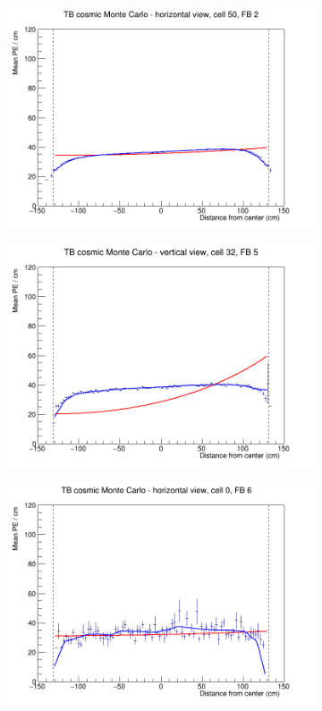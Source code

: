 \documentclass[12pt,a4paper]{article}
\begin{document}
\begin{figure}[h]
  \begin{subfigure}{0.5\textwidth}
    \includegraphics[width=\linewidth]{RelativeCalibrationResults/sim_fb2_001_050.png}
  \end{subfigure}
  \begin{subfigure}{0.5\textwidth}
    \includegraphics[width=\linewidth]{RelativeCalibrationResults/sim_fb5_000_032.png}
  \end{subfigure}
  \begin{subfigure}{0.5\textwidth}
    \includegraphics[width=\linewidth]{RelativeCalibrationResults/sim_fb6_001_000.png}

\end{subfigure}
\end{figure}
\end{document}
